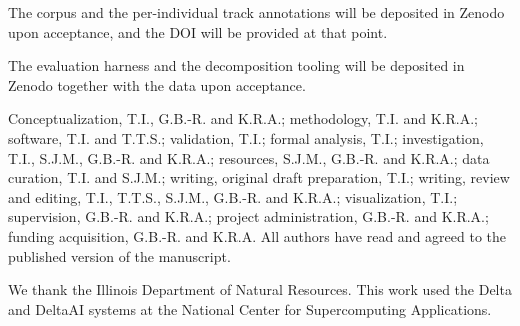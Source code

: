 \documentclass[pdflatex,sn-basic,Numbered]{sn-jnl}
\begin{document}
The corpus and the per-individual track annotations will be deposited in Zenodo upon
acceptance, and the DOI will be provided at that point.

The evaluation harness and the decomposition tooling will be deposited in Zenodo together
with the data upon acceptance.

Conceptualization, T.I., G.B.-R. and K.R.A.; methodology, T.I. and K.R.A.; software, T.I. and
T.T.S.; validation, T.I.; formal analysis, T.I.; investigation, T.I., S.J.M., G.B.-R. and
K.R.A.; resources, S.J.M., G.B.-R. and K.R.A.; data curation, T.I. and S.J.M.; writing,
original draft preparation, T.I.; writing, review and editing, T.I., T.T.S., S.J.M., G.B.-R.
and K.R.A.; visualization, T.I.; supervision, G.B.-R. and K.R.A.; project administration,
G.B.-R. and K.R.A.; funding acquisition, G.B.-R. and K.R.A. All authors have read and agreed
to the published version of the manuscript.

We thank the Illinois Department of Natural Resources. This work used the Delta and DeltaAI
systems at the National Center for Supercomputing Applications.
\end{document}
